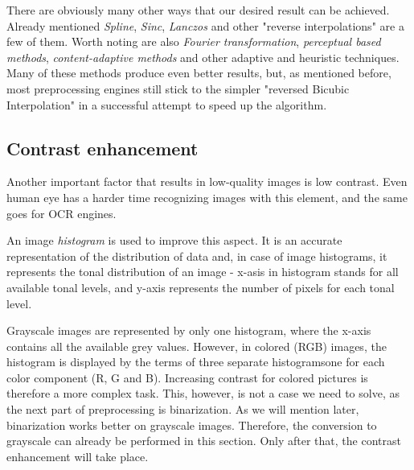 \begin{description}
There are obviously many other ways that our desired result can be achieved. Already mentioned \emph{Spline}, \emph{Sinc}, \emph{Lanczos} and other "reverse interpolations" are a few of them. Worth noting are also \emph{Fourier transformation}, \emph{perceptual based methods}, \emph{content-adaptive methods} and other adaptive and heuristic techniques.
Many of these methods produce even better results, but, as mentioned before, most preprocessing engines still stick to the simpler "reversed Bicubic Interpolation" in a successful attempt to speed up the algorithm.

\end{description}

\subsection{Contrast enhancement}

Another important factor that results in low-quality images is low contrast. Even human eye has a harder time recognizing images 
with this element, and the same goes for OCR engines. 

An image \emph{histogram} is used to improve this aspect. It is an accurate representation of the distribution of data and, in case of image histograms, it represents the tonal distribution of an image - x-asis in histogram stands for all available tonal levels, and y-axis represents the number of pixels for each tonal level.

Grayscale images are represented by only one histogram, where the x-axis contains all the available grey values. However, in colored (RGB) images, the histogram is displayed by the terms of three separate histograms\xxx{ - }one for each color component (R, G and B). Increasing contrast for colored pictures is therefore a more complex task. This, however, is not a case we need to solve, as the next part of preprocessing is binarization. As we will mention later, binarization works better on grayscale images. Therefore, the conversion to grayscale can already be performed in this section. Only after that, the contrast enhancement will take place.

